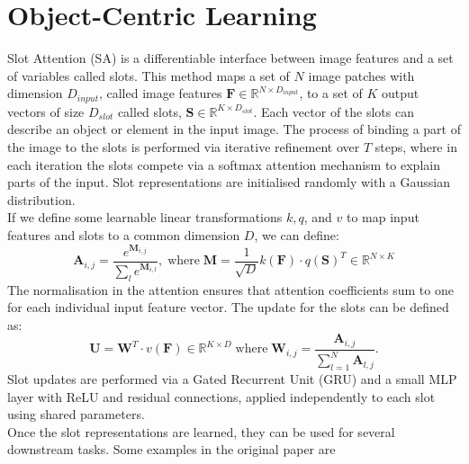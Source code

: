 \section{Object-Centric Learning} 
Slot Attention (SA) \cite{locatello2020objectcentriclearningslotattention} is a differentiable interface between image features and a set of variables called slots. This method maps a set of $N$ image patches with dimension $D_{input}$, called image features $\mathbf{F}\in\mathbb{R}^{N\times D_{input}}$, to a set of $K$ output vectors of size $D_{slot}$ called slots, $\mathbf{S}\in \mathbb{R}^{K\times D_{slot}}$. Each vector of the slots can describe an object or element in the input image. The process of binding a part of the image to the slots is performed via iterative refinement over $T$ steps, where in each iteration the slots compete via a softmax attention mechanism to explain parts of the input. Slot representations are initialised randomly with a Gaussian distribution. \\
If we define some learnable linear transformations $k,q$, and $v$ to map input features and slots to a common dimension $D$, we can define: 
\begin{equation}
    \mathbf{A}_{i,j} = \frac{e^{\mathbf{M}_{i,j}}}{\sum_l e^{\mathbf{M}_{i,l}}}, \; \text{where} \; \mathbf{M}=\frac{1}{\sqrt{D}} k(\mathbf{F})\cdot q(\mathbf{S})^T \in \mathbb{R}^{N\times K}
\end{equation}
The normalisation in the attention ensures that attention coefficients sum to one for each individual input feature vector. The update for the slots can be defined as: 
\begin{equation}
    \mathbf{U} = \mathbf{W}^T\cdot v(\mathbf{F}) \in \mathbb{R}^{K\times D} \; \text{where} \; \mathbf{W}_{i,j} = \frac{\mathbf{A}_{i,j}}{\sum_{l=1}^N \mathbf{A}_{l,j}}.
\end{equation}
Slot updates are performed via a Gated Recurrent Unit (GRU) and a small MLP layer with ReLU and residual connections, applied independently to each slot using shared parameters. \\
Once the slot representations are learned, they can be used for several downstream tasks. Some examples in the original paper \cite{locatello2020objectcentriclearningslotattention} are 
